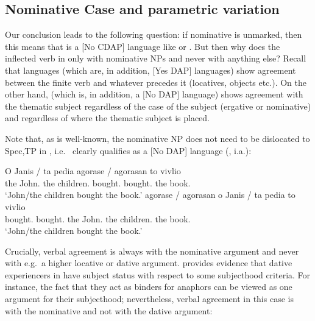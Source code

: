 \documentclass[output=paper]{langsci/langscibook}
\begin{document}
\begin{exe}
\section{Nominative Case and parametric variation}\label{sec:13.4}

Our conclusion leads to the following question: if nominative is unmarked, then this means that  is a [No \gls{CDAP}] language
like  or . But then why does the inflected verb in
 only  with nominative NPs and never
with anything else? Recall that  languages (which are, in addition,
[Yes \gls{DAP}] languages) show agreement between the finite verb and whatever precedes
it (locatives, objects etc.). On the other hand,  (which is, in
addition, a [No \gls{DAP}] language) shows agreement with the thematic subject
regardless of the case of the subject (ergative or nominative) and regardless of where the thematic subject is placed.

Note that, as is well-known, the nominative NP does not
need to be dislocated to Spec,TP in , i.e.\  clearly
qualifies as a [No \gls{DAP}] language (\citealt{AleAna1998}, i.a.):%

\ea%
\label{ex:13.32}
	\ea
	\gll  O Janis / ta pedia agorase / agorasan to vivlio\\
    the John.\Nom{} {} the children.\Nom{} bought.\Tsg{} {} bought.\Tpl{}  the book.\Acc{}\\
	\glt     ‘John/the children bought the book.’
	\ex
	\gll  agorase / agorasan o Janis / ta pedia to vivlio\\
    bought.\Tsg{} {} bought.\Tpl{} the John.\Nom{} {} the children.\Nom{}  the book.\Acc{}\\
	\glt     ‘John/the children bought the book.’
    \z
\z

Crucially, verbal agreement is always with the nominative
argument and never with e.g.\ a higher locative or dative
argument. \citet{Anagnostopoulou1999} provides evidence that dative experiencers in  have subject status with respect to some
subjecthood criteria. For instance, the fact that they act as binders for
anaphors can be viewed as one argument for their subjecthood; nevertheless,
verbal agreement in this case is with the nominative and
not with the dative argument:


\end{exe}
\end{document}
